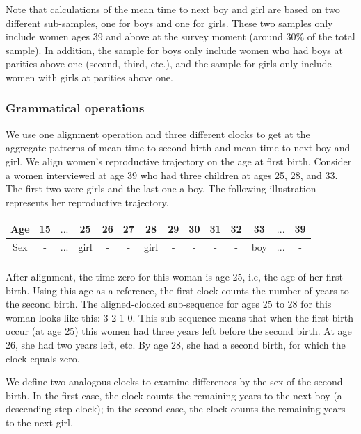 \documentclass{article}
\begin{document}
Note that calculations of the mean time to next boy and girl are based on two different sub-samples, one for boys and one for girls. These two samples only include women ages 39 and above at the survey moment (around 30\% of the total sample). In addition, the sample for boys only include women who had boys at parities above one (second, third, etc.), and the sample for girls only include women with girls at parities above one. %

\subsubsection{Grammatical operations}

We use one alignment operation and three different clocks to get at the aggregate-patterns of mean time to second birth and mean time to next boy and girl. We align women's reproductive trajectory on the age at first birth. Consider a women interviewed at age 39 who had three children at ages 25, 28, and 33. The first two were girls and the last one a boy. The following illustration represents her reproductive trajectory.\\

\begin{center}
\begin{tabular}{cccccccccccccc}
\hline
    Age & 15 & $...$ & 25 & 26 & 27 & 28 & 29 & 30 & 31 & 32 & 33 & $...$ & 39 \\\hline
    Sex & - & $...$ & girl & - & - & girl & - & - & - & - & boy & $...$ & - \\\hline\\
\end{tabular}
\end{center}

After alignment, the time zero for this woman is age 25, i.e, the age of her first birth. Using this age as a reference, the first clock counts the number of years to the second birth. The aligned-clocked sub-sequence for ages 25 to 28 for this woman looks like this: 3-2-1-0. This sub-sequence means that when the first birth occur (at age 25) this women had three years left before the second birth. At age 26, she had two years left, etc. By age 28, she had a second birth, for which the clock equals zero.

We define two analogous clocks to examine differences by the sex of the second birth. In the first case, the clock counts the remaining years to the next boy (a descending step clock); in the second case, the clock counts the remaining years to the next girl. 
\end{document}
